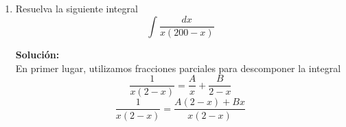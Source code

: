 \documentclass[12pt]{article}
\newenvironment{solucion}
{\begin{mdframed}[backgroundcolor=black!10]
		{\bf Solución:}\\
	}
	{
	\end{mdframed}
}
\newenvironment{preguntas}
{\begin{enumerate}\itemsep12pt
	}
	{
	\end{enumerate}
}
\newcommand{\ra}{\rightarrow}
\begin{document}
\begin{preguntas}
\begin{solucion}
\begin{enumerate}[a)]
\begin{center}
\begin{tikzpicture}[scale=1.25]
				\end{tikzpicture}
			\end{center}
			Finalmente, 
			$$\displaystyle\int \dfrac{xdx}{\sqrt[]{1+x^2}} = \sqrt[]{1+x^2} + c$$
\item $\displaystyle\int \dfrac{dx}{x\ \sqrt[]{x^2-1}}$\\\\
			Al identificar la expresión de la forma $x^2-a^2$, sabemos que debemos ocupar
			$$x = sec(\theta) \ra dx = sec(\theta)tan(\theta)$$
			Luego obtenemos
			$$\displaystyle\int \dfrac{sec(\theta)tan(\theta)d\theta}{sec(\theta)\ \sqrt[]{sec^2(\theta)-1}}
			= \displaystyle\int \dfrac{tan(\theta)d\theta}{\sqrt[]{tan^2(\theta)}}
			= \displaystyle\int d\theta = \theta + c$$
			Como $x = tan(\theta) \ra \theta = arctan(x)$
			Finalmente,
			$$\displaystyle\int \dfrac{dx}{x\ \sqrt[]{x^2-1}} = arctan(\theta) + c$$
\item $\displaystyle\int \dfrac{dx}{\sqrt[]{16+6x-x^2}}$\\\\
			Como no podemos ver ninguna expresión como las mencionadas anteriormente, vamos a hacer completación de cuadrados
			$$16+6x-x^2 = 25 - 9 + 6x - x^2 = 25 - (x^2-6x+9) = 25 - (x-3)^2$$
			Luego, la integral es
			$$\displaystyle\int \dfrac{dx}{\sqrt[]{25 - (x-3)^2}}$$
			Aqui si podemos identificar una expresión del tipo $a^2-x^2$, por lo que el cambio que corresponde hacer es
			$$x-3 = 5sen(\theta) \ra dx = 5cos(\theta)d\theta$$
			Entonces obtenemos la integral
			$$\displaystyle\int \dfrac{5cos(\theta)d\theta}{\sqrt[]{25 - 25sen^2(\theta)}}
			=\displaystyle\int \dfrac{5cos(\theta)d\theta}{\sqrt[]{25(1 - sen^2(\theta))}}
			=\displaystyle\int \dfrac{5cos(\theta)d\theta}{\sqrt[]{25cos^2(\theta)}}$$
			$$=\displaystyle\int \dfrac{5cos(\theta)d\theta}{5cos(\theta)} 
			= \displaystyle\int d\theta = \theta + c$$
			Como $x-3 = 5sen(\theta) \ra \theta = arcsen\left(\dfrac{x-3}{5}\right)$\\
			Finalmente,
			$$\displaystyle\int \dfrac{dx}{\sqrt[]{16+6x-x^2}} = arcsen\left(\dfrac{x-3}{5}\right) + c$$
\end{enumerate}
\end{solucion}
\item Resuelva la siguiente integral
	$$\displaystyle\int \dfrac{dx}{x(200-x)}$$
\begin{solucion}
En primer lugar, utilizamos fracciones parciales para descomponer la integral
		$$\dfrac{1}{x(2-x)} = \dfrac{A}{x} + \dfrac{B}{2-x}$$
		$$\dfrac{1}{x(2-x)} = \dfrac{A(2-x) + Bx}{x(2-x)}$$

\end{solucion}
\end{preguntas}
\end{document}

